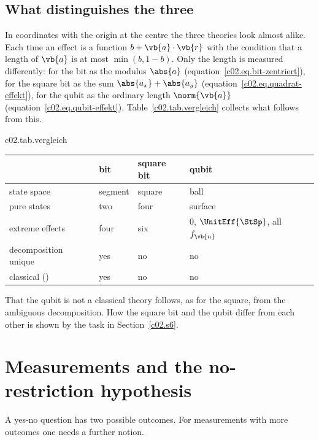 \subsection{What distinguishes the three}\label{c02.s4.4}

In coordinates with the origin at the centre the three theories look almost alike. Each
time an effect is a function $b + \vb{a}\cdot\vb{r}$ with the condition that a length of
$\vb{a}$ is at most $\min(b, 1-b)$. Only the length is measured differently: for the bit as
the modulus $\abs{a}$ (equation~\eqref{c02.eq.bit-zentriert}), for the square bit as the
sum $\abs{a_x} + \abs{a_y}$ (equation~\eqref{c02.eq.quadrat-effekt}), for the qubit as the
ordinary length $\norm{\vb{a}}$ (equation~\eqref{c02.eq.qubit-effekt}).
Table~\ref{c02.tab.vergleich} collects what follows from this.

\begin{tpctable}{c02.tab.vergleich}
  \caption{The three theories compared. The entries are the results of
    Propositions~\ref{c02.prop.bit}, \ref{c02.prop.quadrat}, \ref{c02.prop.bloch} and
    \ref{c02.prop.qubit-effekte} and of equations~\eqref{c02.eq.bit} and
    \eqref{c02.eq.quadrat-mitte}.}
  \begin{tabular}{llll}
    \toprule
      & bit & square bit & qubit \\
    \midrule
    state space & segment & square & ball \\
    pure states & two & four & surface \\
    extreme effects & four & six & $0$, $\UnitEff{\StSp}$, all $f_{\vb{n}}$ \\
    decomposition unique & yes & no & no \\
    classical ({D11}) & yes & no & no \\
    \bottomrule
  \end{tabular}
\end{tpctable}

That the qubit is not a classical theory follows, as for the square, from the ambiguous
decomposition. How the square bit and the qubit differ from each other is shown by the
task in Section~\ref{c02.s6}.

\section{Measurements and the no-restriction hypothesis}\label{c02.s5}

A yes-no question has two possible outcomes. For measurements with more outcomes one needs
a further notion.

